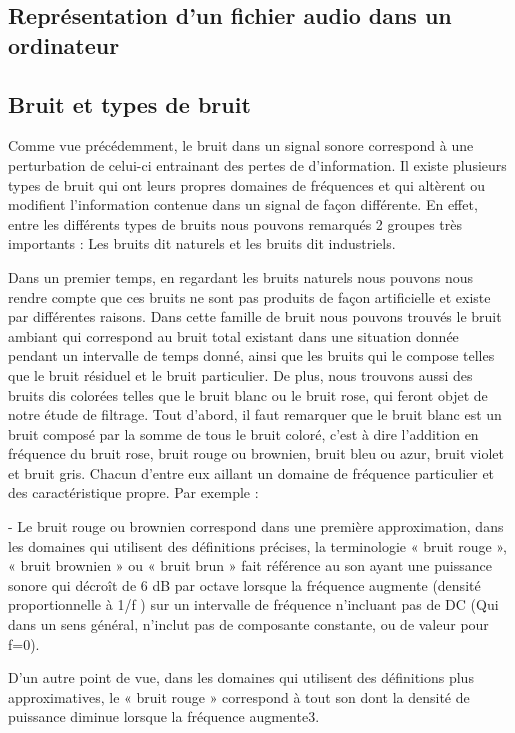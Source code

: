 \documentclass[conference,onecolumn]{IEEEtran}
\begin{document}
\subsection{Représentation d’un fichier audio dans un ordinateur}

\subsection{Bruit et types de bruit}
Comme vue précédemment, le bruit dans un signal sonore correspond à une perturbation de celui-ci entrainant des pertes de d’information. Il existe plusieurs types de bruit qui ont leurs propres domaines de fréquences et qui altèrent ou modifient l’information contenue dans un signal de façon différente. En effet, entre les différents types de bruits nous pouvons remarqués 2 groupes très importants : Les bruits dit naturels et les bruits dit industriels.  

Dans un premier temps, en regardant les bruits naturels nous pouvons nous rendre compte que ces bruits ne sont pas produits de façon artificielle et existe par différentes raisons. Dans cette famille de bruit nous pouvons trouvés le bruit ambiant qui correspond au bruit total existant dans une situation donnée pendant un intervalle de temps donné, ainsi que les bruits qui le compose telles que le bruit résiduel et le bruit particulier. De plus, nous trouvons aussi des bruits dis colorées telles que le bruit blanc ou le bruit rose, qui feront objet de notre étude de filtrage. Tout d’abord, il faut remarquer que le bruit blanc est un bruit composé par la somme de tous le bruit coloré, c’est à dire l’addition en fréquence du bruit rose, bruit rouge ou brownien, bruit bleu ou azur, bruit violet et bruit gris. Chacun d’entre eux aillant un domaine de fréquence particulier et des caractéristique propre. Par exemple : 

 - Le bruit rouge ou brownien correspond dans une première approximation, dans les domaines qui utilisent des définitions précises, la terminologie « bruit rouge », « bruit brownien » ou « bruit brun » fait référence au son ayant une puissance sonore qui décroît de 6 dB par octave lorsque la fréquence augmente (densité proportionnelle à 1/f ) sur un intervalle de fréquence n'incluant pas de DC (Qui dans un sens général, n'inclut pas de composante constante, ou de valeur pour f=0). 

D’un autre point de vue, dans les domaines qui utilisent des définitions plus approximatives, le « bruit rouge » correspond à tout son dont la densité de puissance diminue lorsque la fréquence augmente3. 
\end{document}
